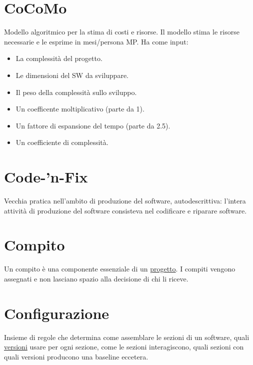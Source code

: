 	\section{CoCoMo}
	\label{sec:cocomo}
	Modello algoritmico per la stima di costi e risorse. Il modello stima le risorse necessarie e le esprime in mesi/persona MP. Ha come input:
	\begin{itemize}  
	\item La complessità del progetto.
	\item Le dimensioni del SW da sviluppare.
	\item Il peso della complessità sullo sviluppo.
	\item Un coefficente moltiplicativo (parte da 1).
	\item Un fattore di espansione del tempo (parte da 2.5).
	\item Un coefficiente di complessità. 
	\end{itemize}		

	\section{Code-'n-Fix}
	\label{sec:codenfix}
	Vecchia pratica nell'ambito di produzione del software, autodescrittiva: l'intera attività di produzione del software consisteva nel codificare e riparare software.
	
	\section{Compito}
	\label{sec:compiti}
	Un compito è una componente essenziale di un \hyperref[sec:progetto]{progetto}. I compiti vengono assegnati e non lasciano spazio alla decisione di chi li riceve.
	
	\section{Configurazione}
	\label{sec:configurazione}
	Insieme di regole che determina come assemblare le sezioni di un software, quali \hyperref[sec:versione]{versioni} usare per ogni sezione, come le sezioni interagiscono, quali sezioni con quali versioni producono una baseline eccetera.
	
